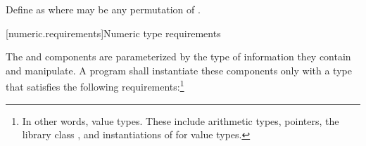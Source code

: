 %
\pnum
Define  as
where
 may be any permutation of .

[numeric.requirements]{Numeric type requirements}

\pnum
The
and
components are parameterized by the type of information they contain and manipulate.
A \Cpp program shall instantiate these components only with a type
that satisfies the
following requirements:\footnote{In other words, value types.
These include arithmetic types,
pointers, the library class
,
and instantiations of
for value types.}

